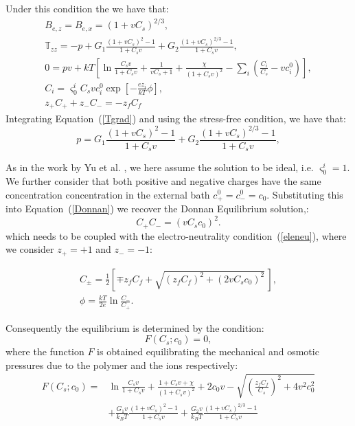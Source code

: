 \documentclass[12pt]{extarticle}
\begin{document}
Under this condition the we have that:
\begin{gather}
B_{e,z}=B_{e,x} = (1+vC_s)^{2/3},\\
\mathbb{T}_{zz} = -p + G_1\frac{(1+vC_s)^2-1}{1+C_sv}+ G_2 \frac{(1+vC_s)^{2/3}-1}{1+C_sv},\label{eqT}\\[2mm]
\textstyle
0 = pv + kT \left[\ln \frac{C_sv}{1+C_sv} + \frac{1}{vC_s+1}+\frac{\chi}{(1+C_sv)^2}-\sum_i \left(\frac{C_i}{C_s}-vc^0_i\right)\right],\label{eqmu}\\[2mm]
C_i = \varsigma^i_0C_s vc^0_i\exp\left[-\frac{ez_i}{kT}\phi\right],\label{Donnan}\\[2mm]
z_+ C_+ + z_-C_- = -z_f C_f\label{eleneu}
\end{gather}
Integrating Equation~(\ref{Tgrad}) and using the stress-free condition, we have that:
\begin{equation}
p = G_1\frac{(1+vC_s)^2-1}{1+C_sv}+ G_2 \frac{(1+vC_s)^{2/3}-1}{1+C_sv},
\end{equation}

As in the work by Yu et al. \cite{swell2}, we here assume the solution to be ideal, i.e. $\varsigma^i_0=1$. We further consider that both positive and negative charges have the same concentration concentration in the external bath $c^0_+=c^0_-=c_0$. Substituting this into Equation~(\ref{Donnan}) we recover the Donnan Equilibrium solution,\cite{ecm}:
\begin{equation}
C_+C_- = (vC_sc_0)^2.
\end{equation} 
which needs to be coupled with the electro-neutrality condition~(\ref{eleneu}), where we consider $z_+=+1$ and $z_-=-1$:

\begin{eqnarray}
C_{\pm}= \frac{1}{2}\left[\mp z_fC_f+ \sqrt{(z_fC_f)^2+(2vC_sc_0)^2}\,\right],\label{eqion}\\
\phi = \frac{kT}{2e} \ln \frac{C_-}{C_+}.
\end{eqnarray}

Consequently the equilibrium is determined by the condition:
\begin{equation}
F(C_s;c_0)=0,
\end{equation}
where the function $F$ is obtained equilibrating the mechanical and osmotic pressures due to the polymer and the ions respectively:
\begin{equation}
\begin{aligned}
F(C_s; c_0) =  &\ln \frac{C_sv}{1+C_sv} +\frac{1+C_sv+\chi}{(1+C_sv)^2}+2c_0v-\sqrt{\left(\frac{z_fC_f}{C_s}\right)^2+4v^2c^2_0} \\[1.5mm]
&+\frac{G_1v}{k_BT} \frac{(1+vC_s)^2-1}{1+C_sv}+ \frac{G_2v}{k_BT} \frac{(1+vC_s)^{2/3}-1}{1+C_sv}
\end{aligned}
\end{equation}
\end{document}
